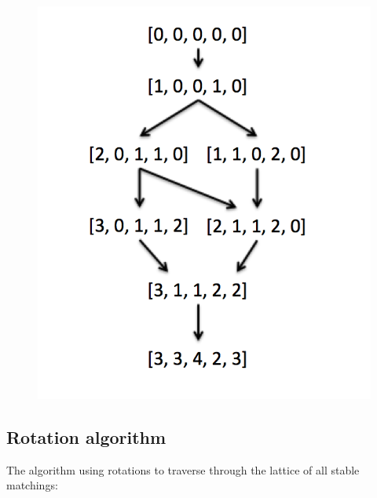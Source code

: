 \documentclass[a4paper]{article}
\begin{document}
\begin{figure}[H]
\includegraphics[scale=0.6]{stable_matching_poset.png}
\centering
\end{figure}

\subsection{Rotation algorithm}
The algorithm using rotations to traverse through the lattice of all stable matchings:
\end{document}
